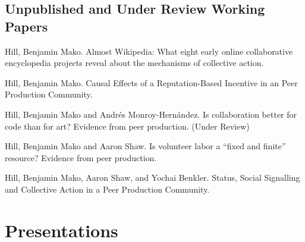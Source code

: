 \documentclass[11pt]{article}
\newenvironment{cvlist}{
\begin{list}{}{\leftmargin=3.0em \itemindent=-3.0em}
  \setlength{\itemsep}{0pt}
  \setlength{\parskip}{0em}
  \setlength{\parsep}{1em}
  \setlength{\parindent}{0em}}
{\vspace{1em}
\end{list}}
\begin{document}
\subsection{Unpublished and Under Review Working Papers}
\begin{cvlist}
\item Hill, Benjamin Mako. Almost Wikipedia: What eight early online
  collaborative encyclopedia projects reveal about the mechanisms of
  collective action.
\item Hill, Benjamin Mako. Causal Effects of a Reputation-Based
  Incentive in an Peer Production Community.
\item Hill, Benjamin Mako and Andrés Monroy-Hernández. Is collaboration
 better for code than for art? Evidence from peer production. (Under
  Review)
\item Hill, Benjamin Mako and Aaron Shaw. Is volunteer labor a
``fixed and finite'' resource? Evidence from peer production.
\item Hill, Benjamin Mako, Aaron Shaw, and Yochai Benkler. Status,
  Social Signalling and Collective Action in a Peer Production
  Community.
\end{cvlist}

\section{Presentations}
\end{document}
